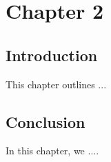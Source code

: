 \chapter{Chapter 2}
\minitoc
\label{chap:2nd}

\section*{Introduction}
    This chapter outlines ...

\section*{Conclusion}
    In this chapter, we ....